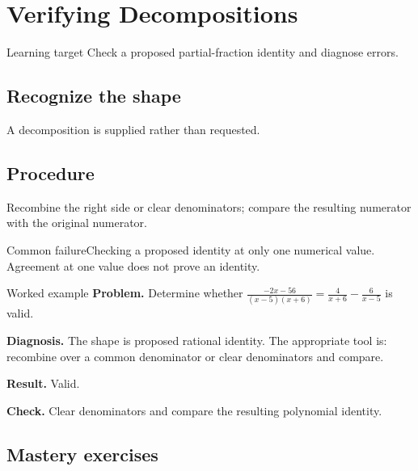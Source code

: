 \documentclass[11pt,oneside]{book}
\begin{document}
\chapter{Verifying Decompositions}
\begin{rulebox}{Learning target}
Check a proposed partial-fraction identity and diagnose errors.
\end{rulebox}
\section{Recognize the shape}
A decomposition is supplied rather than requested.
\section{Procedure}
Recombine the right side or clear denominators; compare the resulting numerator with the original numerator.

\begin{warningbox}{Common failure}Checking a proposed identity at only one numerical value. Agreement at one value does not prove an identity.\end{warningbox}
\begin{examplebox}{Worked example}
\textbf{Problem.} Determine whether $\displaystyle \frac{- 2 x - 56}{\left(x - 5\right) \left(x + 6\right)}=\frac{4}{x + 6} - \frac{6}{x - 5}$ is valid.

\textbf{Diagnosis.} The shape is proposed rational identity. The appropriate tool is: recombine over a common denominator or clear denominators and compare.

\textbf{Result.} Valid.

\textbf{Check.} Clear denominators and compare the resulting polynomial identity.
\end{examplebox}
\section{Mastery exercises}
\end{document}

